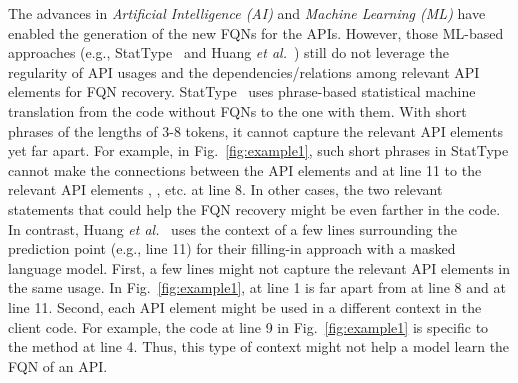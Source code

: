 The advances in {\em Artificial Intelligence (AI)} and {\em Machine
  Learning (ML)} have enabled the generation of the new FQNs for the
APIs. However, those ML-based approaches (e.g., StatType~\cite{icse18}
and Huang {\em et al.}~\cite{prompt-ase22}) still do not leverage the
regularity of API usages and the dependencies/relations among relevant
API elements for FQN recovery. StatType~\cite{icse18} uses
phrase-based statistical machine translation from the code without
FQNs to the one with them.  With short phrases of the lengths of 3-8
tokens, it cannot capture the relevant API elements yet far apart. For
example, in Fig.~\ref{fig:example1}, such short phrases in StatType
cannot make the connections between the API elements 
and  at line 11 to the relevant API elements
, , etc. at line 8. In other cases,
the two relevant statements that could help the FQN recovery might be
even farther in the code. In contrast, Huang {\em et
  al.}~\cite{prompt-ase22} uses the context of a few lines surrounding
the prediction point (e.g., line 11) for their filling-in approach
with a masked language model. First, a few lines might not capture the
relevant API elements in the same usage. In Fig.~\ref{fig:example1},
 at line 1 is far apart from  at line 8
and  at line 11. Second, each API element might be used
in a different context in the client code. For example, the code at
line 9 in Fig.~\ref{fig:example1} is specific to the method
 at line 4. Thus, this type of context might not help a
model learn the FQN of an API.


